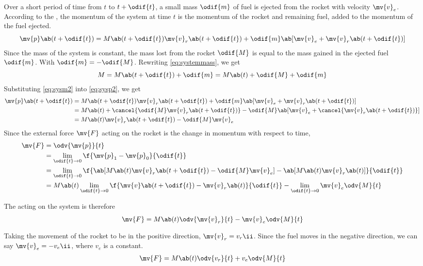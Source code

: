 Over a short period of time from \(t\) to \(t + \odif{t}\),
a small mass \(\odif{m}\) of fuel is ejected from the rocket with
velocity \(\mv{v}_e\). According to the ,
the momentum of the system at time \(t\) is the momentum of the
rocket and remaining fuel,
added to the momentum of the fuel ejected.
\begin{equation}
  \mv{p}\ab(t + \odif{t}) = M\ab(t+\odif{t})\mv{v}_r\ab(t+\odif{t}) +
  \odif{m}\ab[\mv{v}_e + \mv{v}_r\ab(t+\odif{t})]
  \label{eq:sysp2}
\end{equation}
Since the mass of the system is constant, the mass lost from the
rocket \(\odif{M}\)
is equal to the mass gained in the ejected fuel \(\odif{m}\). With
\(\odif{m} = -\odif{M}\). Rewriting \cref{eq:systemmass}, we get
\begin{equation}
  M = M\ab(t+\odif{t}) + \odif{m} = M\ab(t) + \odif{M} + \odif{m}
  \label{eq:sysm2}
\end{equation}
Substituting \cref{eq:sysm2} into \cref{eq:sysp2}, we get
\begin{align*}
  \mv{p}\ab(t + \odif{t}) &= M\ab(t+\odif{t})\mv{v}_r\ab(t+\odif{t}) +
  \odif{m}\ab[\mv{v}_e + \mv{v}_r\ab(t+\odif{t})] \\
  &= M\ab(t) + \cancel{\odif{M}\mv{v}_r\ab(t+\odif{t})} - \odif{M}\ab[\mv{v}_e +
  \cancel{\mv{v}_r\ab(t+\odif{t})}] \\
  &= M\ab(t)\mv{v}_r\ab(t+\odif{t}) - \odif{M}\mv{v}_e
\end{align*}
Since the external force \(\mv{F}\) acting on the rocket is the
change in momentum
with respect to time,
\begin{align*}
  \mv{F} &= \odv{\mv{p}}{t} \\
  &= \lim_{\odif{t}\to 0} \f{\mv{p}_1 - \mv{p}_0}{\odif{t}} \\
  &= \lim_{\odif{t}\to 0} \f{\ab[M\ab(t)\mv{v}_r\ab(t+\odif{t}) -
    \odif{M}\mv{v}_e] -
  \ab[M\ab(t)\mv{v}_r\ab(t)]}{\odif{t}} \\
  &= M\ab(t)\lim_{\odif{t}\to
  0}\f{\mv{v}\ab(t+\odif{t})-\mv{v}_r\ab(t)}{\odif{t}}-\lim_{\odif{t}\to
  0}\mv{v}_e\odv{M}{t}
\end{align*}

The  acting on the system is therefore
\begin{equation}
  \mv{F} = M\ab(t)\odv{\mv{v}_r}{t} - \mv{v}_e\odv{M}{t}
  \label{eq:fext}
\end{equation}

Taking the movement of the rocket to be in the positive direction,
\(\mv{v}_r = v_r\ii\).
Since the fuel moves in the negative direction,
we can say \(\mv{v}_e = -v_e\ii\), where \(v_e\) is a constant.
\begin{align*}
  \mv{F} = M\ab(t)\odv{v_r}{t} + v_e\odv{M}{t}
\end{align*}

